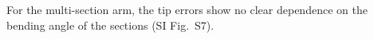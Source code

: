 For the multi-section arm, the tip errors show no clear dependence on the bending angle of the sections (SI Fig.~S7).
